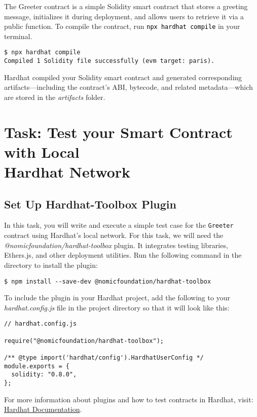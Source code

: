 \documentclass[12pt]{article}
\newcommand{\codeblack}[1]{%
  \texttt{\colorbox{black!7}{\textcolor{black}{#1}}}%
}
\begin{document}
The Greeter contract is a simple Solidity smart contract that stores a greeting message, initializes it during deployment, and allows users to retrieve it via a public function. To compile the contract, run \codeblack{npx hardhat compile} in your terminal.

\begin{verbatim}
$ npx hardhat compile
Compiled 1 Solidity file successfully (evm target: paris).
\end{verbatim}

Hardhat compiled your Solidity smart contract and generated corresponding artifacts—including the contract's ABI, bytecode, and related metadata—which are stored in the \textit{artifacts} folder.

\section{Task: Test your Smart Contract with Local \\ Hardhat Network}

\subsection{Set Up Hardhat-Toolbox Plugin}
In this task, you will write and execute a simple test case for the \texttt{Greeter} contract using Hardhat's local network. For this task, we will need the \textit{@nomicfoundation/hardhat-toolbox} plugin. It integrates testing libraries, Ethers.js, and other deployment utilities. Run the following command in the directory to install the plugin:

\begin{verbatim}
$ npm install --save-dev @nomicfoundation/hardhat-toolbox
\end{verbatim}

To include the plugin in your Hardhat project, add the following to your \textit{hardhat.config.js} file in the project directory so that it will look like this:

\begin{verbatim}
// hardhat.config.js

require("@nomicfoundation/hardhat-toolbox");

/** @type import('hardhat/config').HardhatUserConfig */
module.exports = {
  solidity: "0.8.0",
};
\end{verbatim}
For more information about plugins and how to test contracts in Hardhat, visit: \\ \href{https://hardhat.org/docs}{Hardhat Documentation}.
\end{document}
